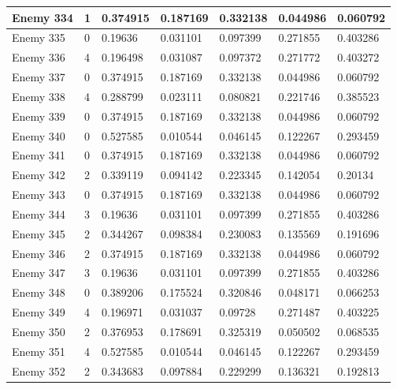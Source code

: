 \begin{longtable}{|l|l|l|l|l|l|l|}
	Enemy 334 & 1 & 0.374915 & {\color[HTML]{FE0000} 0.187169} & 0.332138 & 0.044986 & 0.060792 \\ \hline
	Enemy 335 & 0 & {\color[HTML]{FE0000} 0.19636} & 0.031101 & 0.097399 & 0.271855 & 0.403286 \\ \hline
	Enemy 336 & 4 & 0.196498 & 0.031087 & 0.097372 & 0.271772 & {\color[HTML]{009901} 0.403272} \\ \hline
	Enemy 337 & 0 & {\color[HTML]{009901} 0.374915} & 0.187169 & 0.332138 & 0.044986 & 0.060792 \\ \hline
	Enemy 338 & 4 & 0.288799 & 0.023111 & 0.080821 & 0.221746 & {\color[HTML]{009901} 0.385523} \\ \hline
	Enemy 339 & 0 & {\color[HTML]{009901} 0.374915} & 0.187169 & 0.332138 & 0.044986 & 0.060792 \\ \hline
	Enemy 340 & 0 & {\color[HTML]{009901} 0.527585} & 0.010544 & 0.046145 & 0.122267 & 0.293459 \\ \hline
	Enemy 341 & 0 & {\color[HTML]{009901} 0.374915} & 0.187169 & 0.332138 & 0.044986 & 0.060792 \\ \hline
	Enemy 342 & 2 & 0.339119 & 0.094142 & {\color[HTML]{FE0000} 0.223345} & 0.142054 & 0.20134 \\ \hline
	Enemy 343 & 0 & {\color[HTML]{009901} 0.374915} & 0.187169 & 0.332138 & 0.044986 & 0.060792 \\ \hline
	Enemy 344 & 3 & 0.19636 & 0.031101 & 0.097399 & {\color[HTML]{FE0000} 0.271855} & 0.403286 \\ \hline
	Enemy 345 & 2 & 0.344267 & 0.098384 & {\color[HTML]{FE0000} 0.230083} & 0.135569 & 0.191696 \\ \hline
	Enemy 346 & 2 & 0.374915 & 0.187169 & {\color[HTML]{FE0000} 0.332138} & 0.044986 & 0.060792 \\ \hline
	Enemy 347 & 3 & 0.19636 & 0.031101 & 0.097399 & {\color[HTML]{FE0000} 0.271855} & 0.403286 \\ \hline
	Enemy 348 & 0 & {\color[HTML]{009901} 0.389206} & 0.175524 & 0.320846 & 0.048171 & 0.066253 \\ \hline
	Enemy 349 & 4 & 0.196971 & 0.031037 & 0.09728 & 0.271487 & {\color[HTML]{009901} 0.403225} \\ \hline
	Enemy 350 & 2 & 0.376953 & 0.178691 & {\color[HTML]{FE0000} 0.325319} & 0.050502 & 0.068535 \\ \hline
	Enemy 351 & 4 & 0.527585 & 0.010544 & 0.046145 & 0.122267 & {\color[HTML]{FE0000} 0.293459} \\ \hline
	Enemy 352 & 2 & 0.343683 & 0.097884 & {\color[HTML]{FE0000} 0.229299} & 0.136321 & 0.192813 \\ \hline

\end{longtable}
